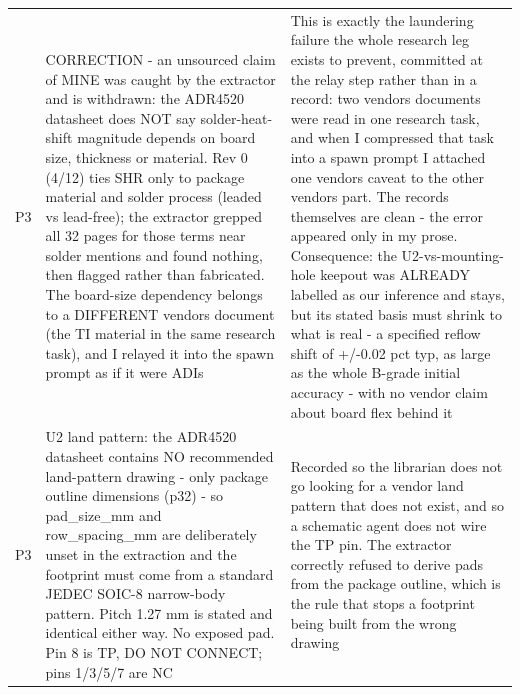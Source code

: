 \documentclass[11pt,a4paper]{article}
\begin{document}
{\begin{longtable}{lp{5.2cm}p{7.2cm}}
P3 & CORRECTION - an unsourced claim of MINE was caught by the extractor and is withdrawn: the ADR4520 datasheet does NOT say solder-heat-shift magnitude depends on board size, thickness or material. Rev 0 (4/12) ties SHR only to package material and solder process (leaded vs lead-free); the extractor grepped all 32 pages for those terms near solder mentions and found nothing, then flagged rather than fabricated. The board-size dependency belongs to a DIFFERENT vendors document (the TI material in the same research task), and I relayed it into the spawn prompt as if it were ADIs & This is exactly the laundering failure the whole research leg exists to prevent, committed at the relay step rather than in a record: two vendors documents were read in one research task, and when I compressed that task into a spawn prompt I attached one vendors caveat to the other vendors part. The records themselves are clean - the error appeared only in my prose. Consequence: the U2-vs-mounting-hole keepout was ALREADY labelled as our inference and stays, but its stated basis must shrink to what is real - a specified reflow shift of +/-0.02 pct typ, as large as the whole B-grade initial accuracy - with no vendor claim about board flex behind it \\
P3 & U2 land pattern: the ADR4520 datasheet contains NO recommended land-pattern drawing - only package outline dimensions (p32) - so pad\_size\_mm and row\_spacing\_mm are deliberately unset in the extraction and the footprint must come from a standard JEDEC SOIC-8 narrow-body pattern. Pitch 1.27 mm is stated and identical either way. No exposed pad. Pin 8 is TP, DO NOT CONNECT; pins 1/3/5/7 are NC & Recorded so the librarian does not go looking for a vendor land pattern that does not exist, and so a schematic agent does not wire the TP pin. The extractor correctly refused to derive pads from the package outline, which is the rule that stops a footprint being built from the wrong drawing \\

\end{longtable}}
\end{document}
